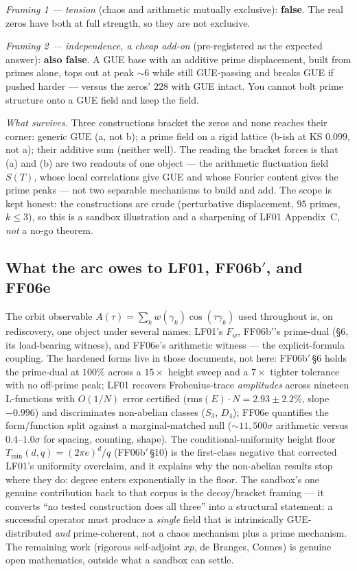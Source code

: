 \documentclass[11pt,a4paper]{article}
\theoremstyle{definition}
\theoremstyle{plain}
\begin{document}
\emph{Framing 1 --- tension} (chaos and arithmetic mutually exclusive): \textbf{false}. The real
zeros have both at full strength, so they are not exclusive.

\emph{Framing 2 --- independence, a cheap add-on} (pre-registered as the expected answer):
\textbf{also false}. A GUE base with an additive prime displacement, built from primes alone, tops
out at peak $\sim$$6$ while still GUE-passing and breaks GUE if pushed harder --- versus the zeros'
$228$ with GUE intact. You cannot bolt prime structure onto a GUE field and keep the field.

\emph{What survives.} Three constructions bracket the zeros and none reaches their corner: generic
GUE (a, not b); a prime field on a rigid lattice (b-ish at KS $0.099$, not a); their additive sum
(neither well). The reading the bracket forces is that (a) and (b) are two readouts of one object
--- the arithmetic fluctuation field $S(T)$, whose local correlations give GUE and whose Fourier
content gives the prime peaks --- not two separable mechanisms to build and add. The scope is kept
honest: the constructions are crude (perturbative displacement, $95$ primes, $k\le3$), so this is a
sandbox illustration and a sharpening of \textsf{LF01} Appendix~C, \emph{not} a no-go theorem.

\subsection{What the arc owes to \textsf{LF01}, \textsf{FF06b$'$}, and \textsf{FF06e}}
The orbit observable $A(\tau)=\sum_k w(\gamma_k)\cos(\tau\gamma_k)$ used throughout is, on
rediscovery, one object under several names: \textsf{LF01}'s $F_w$, \textsf{FF06b$'$}'s prime-dual
(\S6, its load-bearing witness), and \textsf{FF06e}'s arithmetic witness --- the explicit-formula
coupling. The hardened forms live in those documents, not here: \textsf{FF06b$'$}\,\S6 holds the
prime-dual at $100\%$ across a $15\times$ height sweep and a $7\times$ tighter tolerance with no
off-prime peak; \textsf{LF01} recovers Frobenius-trace \emph{amplitudes} across nineteen L-functions
with $O(1/N)$ error certified (rms$(E)\cdot N=2.93\pm2.2\%$, slope $-0.996$) and discriminates
non-abelian classes ($S_3$, $D_4$); \textsf{FF06e} quantifies the form/function split against a
marginal-matched null ($\sim$$11{,}500\sigma$ arithmetic versus $0.4$--$1.0\sigma$ for spacing,
counting, shape). The conditional-uniformity height floor $T_{\min}(d,q)=(2\pi e)^d/q$
(\textsf{FF06b$'$}\,\S10) is the first-class negative that corrected \textsf{LF01}'s uniformity
overclaim, and it explains why the non-abelian results stop where they do: degree enters
exponentially in the floor. The sandbox's one genuine contribution back to that corpus is the
decoy/bracket framing --- it converts ``no tested construction does all three'' into a structural
statement: a successful operator must produce a \emph{single} field that is intrinsically
GUE-distributed \emph{and} prime-coherent, not a chaos mechanism plus a prime mechanism. The
remaining work (rigorous self-adjoint $xp$, de Branges, Connes) is genuine open mathematics, outside
what a sandbox can settle.
\end{document}
